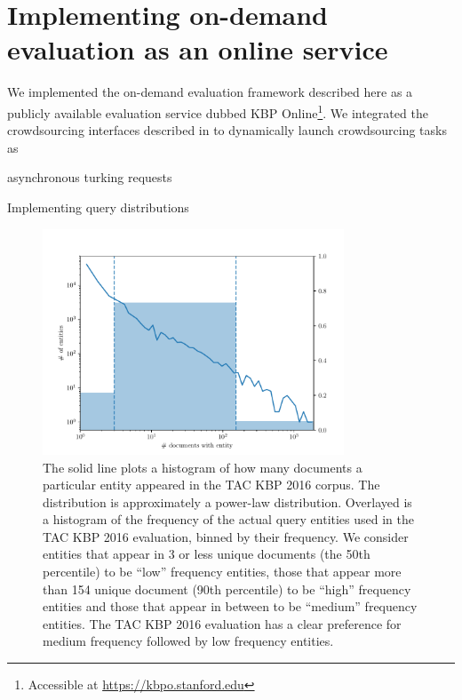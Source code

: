 \section{\label{sec:kbpo:kbpo} Implementing on-demand evaluation as an online service}



We implemented the on-demand evaluation framework described here as a publicly available evaluation service dubbed KBP Online\footnote{Accessible at \url{https://kbpo.stanford.edu}}.
We integrated the crowdsourcing interfaces described in  to dynamically launch crowdsourcing tasks as 

asynchronous turking requests

Implementing query distributions

\begin{figure}
  \centering
  \includegraphics[width=0.8\textwidth]{figures/analysis/distribution}
  \caption[TAC KBP 2016 Query entity distribution]{\label{fig:kbpo:distribution}
    The solid line plots a histogram of how many documents a particular entity appeared in the TAC KBP 2016 corpus.
    The distribution is approximately a power-law distribution.
    Overlayed is a histogram of the frequency of the actual query entities used in the TAC KBP 2016 evaluation, binned by their frequency. We consider entities that appear in 3 or less unique documents (the 50th percentile) to be ``low'' frequency entities, those that appear more than 154 unique document (90th percentile) to be ``high'' frequency entities and those that appear in between to be ``medium'' frequency entities.
    The TAC KBP 2016 evaluation has a clear preference for medium frequency followed by low frequency entities.
  }
\end{figure}

